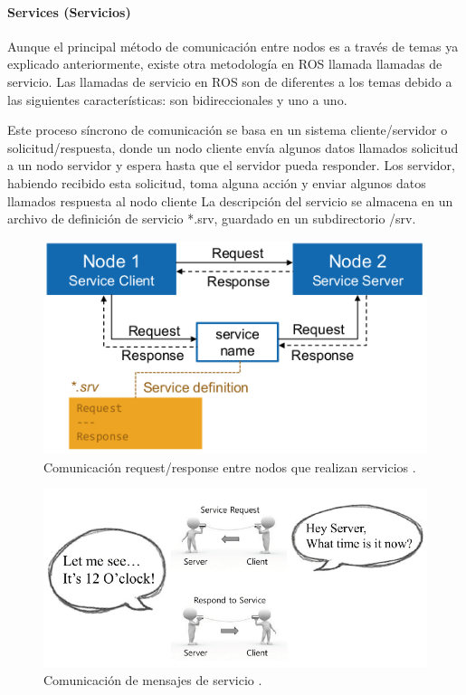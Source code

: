                \newpage


            \paragraph{Services (Servicios)}
                 Aunque el principal método de comunicación entre nodos es a través de temas ya explicado anteriormente, existe otra metodología en ROS llamada llamadas de servicio. Las llamadas de servicio en ROS son de diferentes a los temas debido a las siguientes características: son bidireccionales y uno a uno. 
                 
                Este proceso síncrono de comunicación se basa en un sistema cliente/servidor o solicitud/respuesta, donde un nodo cliente envía algunos datos llamados solicitud a un nodo servidor y espera hasta que el servidor pueda responder. Los servidor, habiendo recibido esta solicitud, toma alguna acción  y enviar algunos datos llamados respuesta al nodo cliente
                La descripción del servicio se almacena en un archivo de definición de servicio *.srv, guardado en un subdirectorio /srv. 

            \begin{figure}[htb]
                \centering
                \includegraphics[width=0.85\linewidth]{Main/Chapter3/Images3/n_s_a_9.png}
                \caption{Comunicación request/response entre nodos que realizan servicios \cite{rosmaster_diagram}.}
                \label{f:Cap3_conceptos_9}
            \end{figure} 
            
            \begin{figure}[htb]
                \centering
                \includegraphics[width=1.0\linewidth]{Main/Chapter3/Images3/n_s_a_10.PNG}
                \caption{Comunicación de mensajes de servicio \cite{ROS_BOOK_1}.}
                \label{f:Cap3_conceptos_10}
            \end{figure}             

